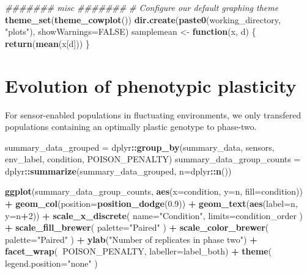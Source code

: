 \documentclass[]{book}
\newenvironment{Shaded}{\begin{snugshade}}{\end{snugshade}}
\newcommand{\CommentTok}[1]{\textcolor[rgb]{0.56,0.35,0.01}{\textit{#1}}}
\newcommand{\ControlFlowTok}[1]{\textcolor[rgb]{0.13,0.29,0.53}{\textbf{#1}}}
\newcommand{\DataTypeTok}[1]{\textcolor[rgb]{0.13,0.29,0.53}{#1}}
\newcommand{\DecValTok}[1]{\textcolor[rgb]{0.00,0.00,0.81}{#1}}
\newcommand{\FloatTok}[1]{\textcolor[rgb]{0.00,0.00,0.81}{#1}}
\newcommand{\KeywordTok}[1]{\textcolor[rgb]{0.13,0.29,0.53}{\textbf{#1}}}
\newcommand{\NormalTok}[1]{#1}
\newcommand{\OperatorTok}[1]{\textcolor[rgb]{0.81,0.36,0.00}{\textbf{#1}}}
\newcommand{\OtherTok}[1]{\textcolor[rgb]{0.56,0.35,0.01}{#1}}
\newcommand{\StringTok}[1]{\textcolor[rgb]{0.31,0.60,0.02}{#1}}
\begin{document}
\begin{Shaded}
\begin{Highlighting}[]
\CommentTok{####### misc #######}
\CommentTok{# Configure our default graphing theme}
\KeywordTok{theme_set}\NormalTok{(}\KeywordTok{theme_cowplot}\NormalTok{())}
\KeywordTok{dir.create}\NormalTok{(}\KeywordTok{paste0}\NormalTok{(working_directory, }\StringTok{"plots"}\NormalTok{), }\DataTypeTok{showWarnings=}\OtherTok{FALSE}\NormalTok{)}
\NormalTok{samplemean <-}\StringTok{ }\ControlFlowTok{function}\NormalTok{(x, d) \{}
  \KeywordTok{return}\NormalTok{(}\KeywordTok{mean}\NormalTok{(x[d]))}
\NormalTok{\}}
\end{Highlighting}
\end{Shaded}

\hypertarget{evolution-of-phenotypic-plasticity-1}{%
\section{Evolution of phenotypic plasticity}\label{evolution-of-phenotypic-plasticity-1}}

For sensor-enabled populations in fluctuating environments, we only transfered populations containing an optimally plastic genotype to phase-two.

\begin{Shaded}
\begin{Highlighting}[]
\NormalTok{summary_data_grouped =}\StringTok{ }\NormalTok{dplyr}\OperatorTok{::}\KeywordTok{group_by}\NormalTok{(summary_data, sensors, env_label, condition, POISON_PENALTY)}
\NormalTok{summary_data_group_counts =}\StringTok{ }\NormalTok{dplyr}\OperatorTok{::}\KeywordTok{summarize}\NormalTok{(summary_data_grouped, }\DataTypeTok{n=}\NormalTok{dplyr}\OperatorTok{::}\KeywordTok{n}\NormalTok{())}

\KeywordTok{ggplot}\NormalTok{(summary_data_group_counts, }\KeywordTok{aes}\NormalTok{(}\DataTypeTok{x=}\NormalTok{condition, }\DataTypeTok{y=}\NormalTok{n, }\DataTypeTok{fill=}\NormalTok{condition)) }\OperatorTok{+}
\StringTok{  }\KeywordTok{geom_col}\NormalTok{(}\DataTypeTok{position=}\KeywordTok{position_dodge}\NormalTok{(}\FloatTok{0.9}\NormalTok{)) }\OperatorTok{+}
\StringTok{  }\KeywordTok{geom_text}\NormalTok{(}\KeywordTok{aes}\NormalTok{(}\DataTypeTok{label=}\NormalTok{n, }\DataTypeTok{y=}\NormalTok{n}\OperatorTok{+}\DecValTok{2}\NormalTok{)) }\OperatorTok{+}
\StringTok{  }\KeywordTok{scale_x_discrete}\NormalTok{(}
    \DataTypeTok{name=}\StringTok{"Condition"}\NormalTok{,}
    \DataTypeTok{limits=}\NormalTok{condition_order}
\NormalTok{  ) }\OperatorTok{+}
\StringTok{  }\KeywordTok{scale_fill_brewer}\NormalTok{(}
    \DataTypeTok{palette=}\StringTok{"Paired"}
\NormalTok{  ) }\OperatorTok{+}
\StringTok{  }\KeywordTok{scale_color_brewer}\NormalTok{(}
    \DataTypeTok{palette=}\StringTok{"Paired"}
\NormalTok{  ) }\OperatorTok{+}
\StringTok{  }\KeywordTok{ylab}\NormalTok{(}\StringTok{"Number of replicates in phase two"}\NormalTok{) }\OperatorTok{+}
\StringTok{  }\KeywordTok{facet_wrap}\NormalTok{(}\OperatorTok{~}\NormalTok{POISON_PENALTY, }\DataTypeTok{labeller=}\NormalTok{label_both) }\OperatorTok{+}
\StringTok{  }\KeywordTok{theme}\NormalTok{(}
    \DataTypeTok{legend.position=}\StringTok{"none"}
\NormalTok{  )}
\end{Highlighting}
\end{Shaded}
\end{document}
